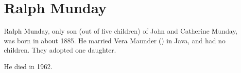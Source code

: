 \section{Ralph Munday}\label{Ralph_Munday}

Ralph Munday, only son (out of five children) of John and Catherine Munday, was born in about 1885. He married Vera Maunder () in Java,\cite{LadiesSection} and had no children. They adopted one daughter.

He died in 1962.\cite{RalphMundayBMD}
